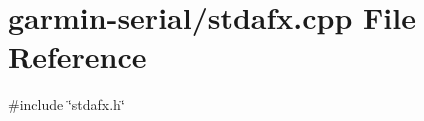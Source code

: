 \hypertarget{garmin-serial_2stdafx_8cpp}{
\section{garmin-\/serial/stdafx.cpp File Reference}
\label{garmin-serial_2stdafx_8cpp}
}
{\ttfamily \#include \char`\"{}stdafx.h\char`\"{}}\par

